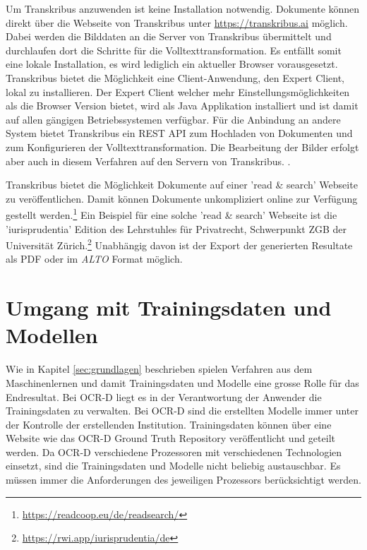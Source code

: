\documentclass[a4paper,oneside, 12pt]{report}
\begin{document}
Um Transkribus anzuwenden ist keine Installation notwendig. Dokumente können direkt über die Webseite von Transkribus unter \url{https://transkribus.ai} möglich. Dabei werden die Bilddaten an die Server von Transkribus übermittelt und durchlaufen dort die Schritte für die Volltexttransformation. Es entfällt somit eine lokale Installation, es wird lediglich ein aktueller Browser vorausgesetzt. Transkribus bietet die Möglichkeit eine Client-Anwendung, den Expert Client, lokal zu installieren. Der Expert Client welcher mehr Einstellungsmöglichkeiten als die Browser Version bietet, wird als Java Applikation installiert und ist damit auf allen gängigen Betriebssystemen verfügbar. 
Für die Anbindung an andere System bietet Transkribus ein REST API zum Hochladen von Dokumenten und zum Konfigurieren der Volltexttransformation. Die Bearbeitung der Bilder erfolgt aber auch in diesem Verfahren auf den Servern von Transkribus. \cite{transkribusapi}. 

Transkribus bietet die Möglichkeit Dokumente auf einer 'read \& search' Webseite zu veröffentlichen. Damit können Dokumente unkompliziert online zur Verfügung gestellt werden.\footnote{\url{https://readcoop.eu/de/readsearch/}} Ein Beispiel für eine solche 'read \& search' Webseite ist die 'iurisprudentia' Edition des Lehrstuhles für Privatrecht, Schwerpunkt ZGB der Universität Zürich.\footnote{\url{https://rwi.app/iurisprudentia/de}}  Unabhängig davon ist der Export der generierten Resultate als PDF oder im \textit{ALTO} Format möglich. \cite{transkribus}



\section{Umgang mit Trainingsdaten und Modellen}
Wie in Kapitel \ref{sec:grundlagen} beschrieben spielen Verfahren aus dem Maschinenlernen und damit Trainingsdaten und Modelle eine grosse Rolle für das Endresultat. Bei OCR-D liegt es in der Verantwortung der Anwender die Trainingsdaten zu verwalten. Bei OCR-D sind die erstellten Modelle immer unter der Kontrolle der erstellenden Institution. Trainingsdaten können über eine Website wie das OCR-D Ground Truth Repository veröffentlicht und geteilt werden. Da OCR-D verschiedene Prozessoren mit verschiedenen Technologien einsetzt, sind die Trainingsdaten und Modelle nicht beliebig austauschbar. Es müssen immer die Anforderungen des jeweiligen Prozessors berücksichtigt werden. \cite{ocrdgtrepo}
\end{document}
